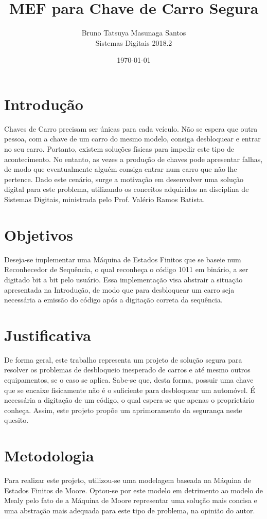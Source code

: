 \documentclass[12pt,a4paper]{article}
\title{MEF para Chave de Carro Segura}
\author{Bruno Tatsuya Masunaga Santos\\
        Sistemas Digitais 2018.2}
\date{\today}
\begin{document}
\maketitle

\section{Introdução}
Chaves de Carro precisam ser únicas para cada veículo. Não se espera que outra pessoa, com a chave de um carro do mesmo modelo, consiga desbloquear e entrar no seu carro. Portanto, existem soluções físicas para impedir este tipo de acontecimento. No entanto, as vezes a produção de chaves pode apresentar falhas, de modo que eventualmente alguém consiga entrar num carro que não lhe pertence. Dado este cenário, surge a motivação em desenvolver uma solução digital para este problema, utilizando os conceitos adquiridos na disciplina de Sistemas Digitais, ministrada pelo Prof. Valério Ramos Batista.  

\section{Objetivos}
Deseja-se implementar uma Máquina de Estados Finitos que se baseie num Reconhecedor de Sequência, o qual reconheça o código 1011 em binário, a ser digitado bit a bit pelo usuário. Essa implementação visa abstrair a situação apresentada na Introdução, de modo que para desbloquear um carro seja necessária a emissão do código após a digitação correta da sequência.

\section{Justificativa}
De forma geral, este trabalho representa um projeto de solução segura para resolver os problemas de desbloqueio inesperado de carros e até mesmo outros equipamentos, se o caso se aplica. Sabe-se que, desta forma, possuir uma chave que se encaixe fisicamente não é o suficiente para desbloquear um automóvel. É necessária a digitação de um código, o qual espera-se que apenas o proprietário conheça. Assim, este projeto propõe um aprimoramento da segurança neste quesito.

\section{Metodologia}
Para realizar este projeto, utilizou-se uma modelagem baseada na Máquina de Estados Finitos de Moore. Optou-se por este modelo em detrimento ao modelo de Mealy pelo fato de a Máquina de Moore representar uma solução mais concisa e uma abstração mais adequada para este tipo de problema, na opinião do autor. 
\end{document}
